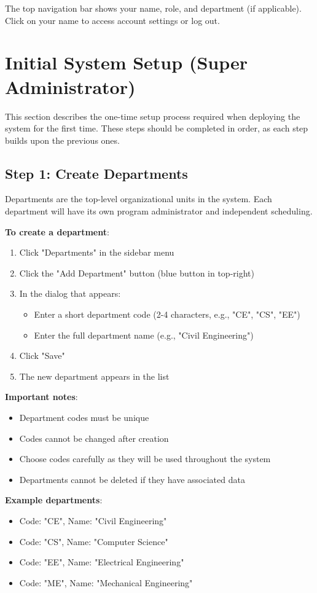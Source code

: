 \documentclass[12pt,a4paper]{article}
\begin{document}
The top navigation bar shows your name, role, and department (if applicable). Click on your name to access account settings or log out.

\section{Initial System Setup (Super Administrator)}

This section describes the one-time setup process required when deploying the system for the first time. These steps should be completed in order, as each step builds upon the previous ones.

\subsection{Step 1: Create Departments}

Departments are the top-level organizational units in the system. Each department will have its own program administrator and independent scheduling.

\textbf{To create a department}:
\begin{enumerate}
\item Click "Departments" in the sidebar menu
\item Click the "Add Department" button (blue button in top-right)
\item In the dialog that appears:
\begin{itemize}
\item Enter a short department code (2-4 characters, e.g., "CE", "CS", "EE")
\item Enter the full department name (e.g., "Civil Engineering")
\end{itemize}
\item Click "Save"
\item The new department appears in the list
\end{enumerate}

\textbf{Important notes}:
\begin{itemize}
\item Department codes must be unique
\item Codes cannot be changed after creation
\item Choose codes carefully as they will be used throughout the system
\item Departments cannot be deleted if they have associated data
\end{itemize}

\textbf{Example departments}:
\begin{itemize}
\item Code: "CE", Name: "Civil Engineering"
\item Code: "CS", Name: "Computer Science"
\item Code: "EE", Name: "Electrical Engineering"
\item Code: "ME", Name: "Mechanical Engineering"
\end{itemize}
\end{document}
